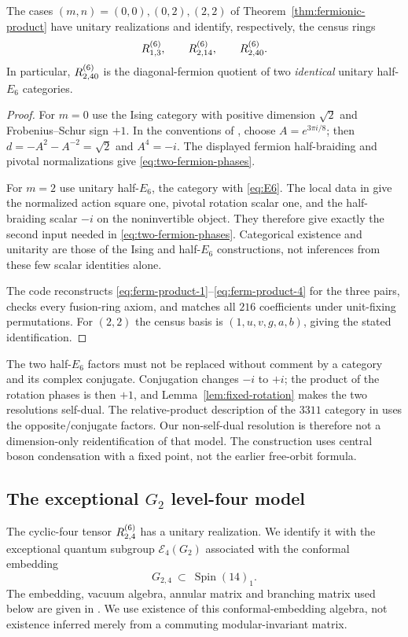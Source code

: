 \begin{corollary}\label{cor:fermionic-models}
The cases $(m,n)=(0,0),(0,2),(2,2)$ of
Theorem~\ref{thm:fermionic-product} have unitary realizations and identify,
respectively, the census rings
\[
 R^{(6)}_{1,3},\qquad R^{(6)}_{2,14},\qquad R^{(6)}_{2,40}.
\]
In particular, $R^{(6)}_{2,40}$ is the diagonal-fermion quotient of two
\emph{identical} unitary half-$E_6$ categories.
\end{corollary}
\begin{proof}
For $m=0$ use the Ising category with positive dimension $\sqrt2$ and
Frobenius--Schur sign $+1$. In the conventions of
\cite[Section~2.1, equations~(9)--(13)]{ALW}, choose $A=e^{3\pi i/8}$;
then $d=-A^2-A^{-2}=\sqrt2$ and $A^4=-i$. The displayed fermion
half-braiding and pivotal normalizations give
\eqref{eq:two-fermion-phases}.

For $m=2$ use unitary half-$E_6$, the category with
\eqref{eq:E6}. The local data in
\cite[Section~7.1, equation~(235), Section~7.2, equation~(240),
Appendix~D.1, equation~(467)]{ALW} give the normalized action square one,
pivotal rotation scalar one, and the half-braiding scalar $-i$ on the
noninvertible object. They therefore give exactly the second input
needed in \eqref{eq:two-fermion-phases}. Categorical existence and
unitarity are those of the Ising and half-$E_6$ constructions, not
inferences from these few scalar identities alone.

The code reconstructs \eqref{eq:ferm-product-1}--\eqref{eq:ferm-product-4}
for the three pairs, checks every fusion-ring axiom, and matches all
$216$ coefficients under unit-fixing permutations. For $(2,2)$ the
census basis is $(1,u,v,g,a,b)$, giving the stated identification.
\end{proof}

The two half-$E_6$ factors must not be replaced without comment by a
category and its complex conjugate. Conjugation changes $-i$ to $+i$;
the product of the rotation phases is then $+1$, and
Lemma~\ref{lem:fixed-rotation} makes the two resolutions self-dual.
The relative-product description of the $3311$ category in
\cite[Section~5.1]{IJMS} uses the opposite/conjugate factors.
Our non-self-dual resolution is therefore not a dimension-only
reidentification of that model. The construction uses central boson
condensation with a fixed point, not the earlier free-orbit formula.

\subsection{The exceptional $G_2$ level-four model}\label{sec:g2-e4}
The cyclic-four tensor $R^{(6)}_{2,4}$ has a unitary realization.
We identify it with the exceptional
quantum subgroup $\mathcal E_4(G_2)$ associated with the conformal
embedding
\begin{equation}\label{eq:g2-embedding}
 G_{2,4}\ \subset\ \operatorname{Spin}(14)_1.
\end{equation}
The embedding, vacuum algebra, annular matrix and branching matrix
used below are given in \cite[Section~4.5, pp.~29--32]{CRT}. We use
existence of this conformal-embedding algebra, not existence inferred
merely from a commuting modular-invariant matrix.

